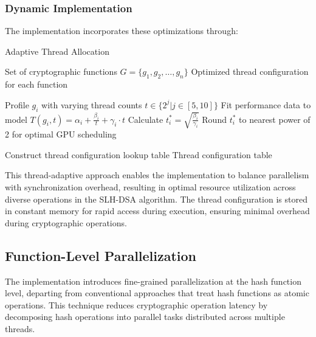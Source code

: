 \documentclass[journal]{IEEEtran}
\begin{document}

\subsubsection{Dynamic Implementation}

The implementation incorporates these optimizations through:

\begin{algorithm}
  \caption{Adaptive Thread Allocation}
  \begin{algorithmic}[1]
    \REQUIRE Set of cryptographic functions $G = \{g_1, g_2, \ldots, g_n\}$
    \ENSURE Optimized thread configuration for each function

    \STATE Profile $g_i$ with varying thread counts $t \in \{2^j | j \in [5, 10]\}$
    \STATE Fit performance data to model $T(g_i, t) = \alpha_i + \frac{\beta_i}{t} + \gamma_i \cdot t$
    \STATE Calculate $t_i^* = \sqrt{\frac{\beta_i}{\gamma_i}}$
    \STATE Round $t_i^*$ to nearest power of 2 for optimal GPU scheduling
    \ENDFOR

    \STATE Construct thread configuration lookup table
    \RETURN Thread configuration table
  \end{algorithmic}
\end{algorithm}

This thread-adaptive approach enables the implementation to balance parallelism with synchronization overhead, resulting in optimal resource utilization across diverse operations in the SLH-DSA algorithm. The thread configuration is stored in constant memory for rapid access during execution, ensuring minimal overhead during cryptographic operations.

\color{black}

\subsection{Function-Level Parallelization}

The implementation introduces fine-grained parallelization at the hash function level, departing from conventional approaches that treat hash functions as atomic operations. This technique reduces cryptographic operation latency by decomposing hash operations into parallel tasks distributed across multiple threads.
\end{document}
